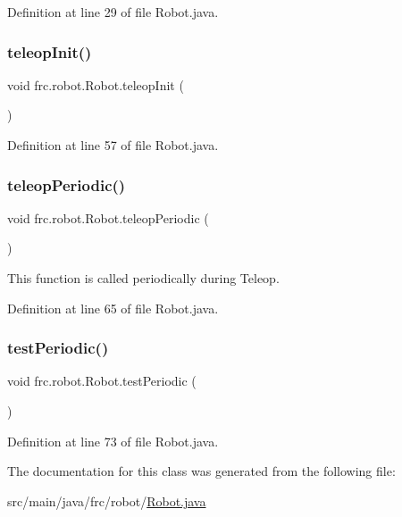 Definition at line 29 of file Robot.\+java.

\mbox{\label{classfrc_1_1robot_1_1Robot_a209dbf07bfec75d73fa53126a8e31b88}} 
\subsubsection{\texorpdfstring{teleop\+Init()}{teleopInit()}}
{\footnotesize\ttfamily void frc.\+robot.\+Robot.\+teleop\+Init (\begin{DoxyParamCaption}{ }\end{DoxyParamCaption})}



Definition at line 57 of file Robot.\+java.

\mbox{\label{classfrc_1_1robot_1_1Robot_ae807171661cbc29081bc10f06d6831e7}} 
\subsubsection{\texorpdfstring{teleop\+Periodic()}{teleopPeriodic()}}
{\footnotesize\ttfamily void frc.\+robot.\+Robot.\+teleop\+Periodic (\begin{DoxyParamCaption}{ }\end{DoxyParamCaption})}



This function is called periodically during Teleop. 



Definition at line 65 of file Robot.\+java.

\mbox{\label{classfrc_1_1robot_1_1Robot_abd152f34b9f33d5cdf835aa61331f33e}} 
\subsubsection{\texorpdfstring{test\+Periodic()}{testPeriodic()}}
{\footnotesize\ttfamily void frc.\+robot.\+Robot.\+test\+Periodic (\begin{DoxyParamCaption}{ }\end{DoxyParamCaption})}



Definition at line 73 of file Robot.\+java.



The documentation for this class was generated from the following file\+:\begin{DoxyCompactItemize}
\item 
src/main/java/frc/robot/\hyperlink{Robot_8java}{Robot.\+java}\end{DoxyCompactItemize}
